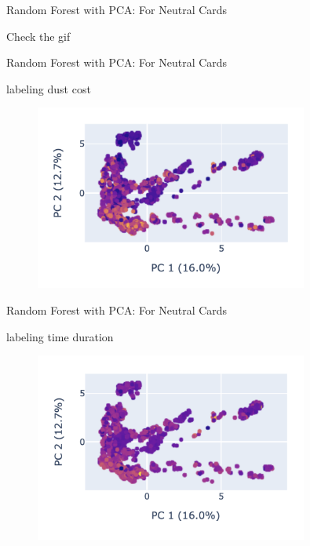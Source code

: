 \documentclass[12pt]{beamer}
\begin{document}
\begin{frame}[fragile]{Random Forest with PCA: For Neutral Cards}

Check the gif

\end{frame}

\begin{frame}[fragile]{Random Forest with PCA: For Neutral Cards}

labeling dust cost

	\begin{figure}
		\begin{center}
			\includegraphics[width=0.8\textwidth]{figure/plot/3d_dust_cost.png}
		\end{center}
	\end{figure}

\end{frame}

\begin{frame}[fragile]{Random Forest with PCA: For Neutral Cards}

labeling time duration

	\begin{figure}
		\begin{center}
			\includegraphics[width=0.8\textwidth]{figure/plot/3e_time_duration.png}
		\end{center}
	\end{figure}

\end{frame}
\end{document}
